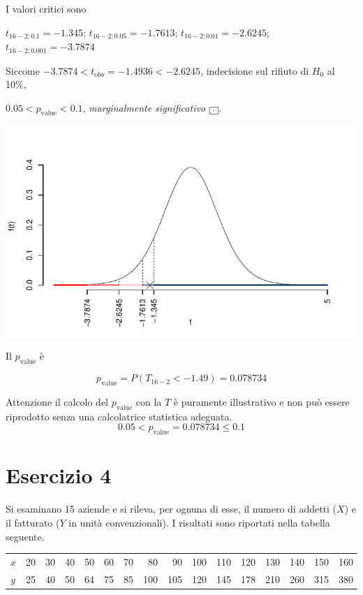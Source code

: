 \documentclass[
  11pt,
]{book}
\theoremstyle{mytheoremstyle}
\theoremstyle{mydefstyle}
\newenvironment{sol}
  {
  \begin{tcolorbox}[enhanced,breakable,arc=0.1mm,boxrule=1pt,colback=white,colframe=iblue,
  title=\bf \fontfamily{lmss}\selectfont \hspace{.5 cm} Soluzione,drop fuzzy shadow]

}{
\end{tcolorbox}
  }
\begin{document}
\begin{sol}
I valori critici sono

\(t_{16-2;0.1}=-1.345\); \(t_{16-2;0.05}=-1.7613\); \(t_{16-2;0.01}=-2.6245\); \(t_{16-2;0.001}=-3.7874\)

Siccome \(-3.7874<t_\text{obs}=-1.4936<-2.6245\), indecisione sul rifiuto di \(H_0\) al 10\%,

\(0.05<p_\text{value}<0.1\), \emph{marginalmente significativo} \(\fbox{.}\).

\begin{center}\includegraphics{Esami_passati_con_soluzioni_files/figure-latex/06-regr-21,-1} \end{center}

Il \(p_{\text{value}}\) è

\[ p_{\text{value}} = P(T_{16-2}<-1.49)=0.078734 \]

Attenzione il calcolo del \(p_\text{value}\) con la \(T\) è puramente illustrativo e non può essere riprodotto senza una calcolatrice statistica adeguata.\[
 0.05 < p_\text{value}= 0.078734 \leq 0.1 
\]

\end{sol}

\section{Esercizio 4}\label{esercizio-4-1}

Si esaminano 15 aziende e si rileva, per ognuna di esse,
il numero di addetti (\(X\)) e il fatturato (\(Y\) in unità
convenzionali).
I risultati sono riportati nella tabella seguente.

\begin{table}[H]
\centering
\begin{tabular}{lrrrrrrrrrrrrrrr}
\toprule
$x$ & 20 & 30 & 40 & 50 & 60 & 70 & 80 & 90 & 100 & 110 & 120 & 130 & 140 & 150 & 160\\
$y$ & 25 & 40 & 50 & 64 & 75 & 85 & 100 & 105 & 120 & 145 & 178 & 210 & 260 & 315 & 380\\
\bottomrule
\end{tabular}
\end{table}
\end{document}
